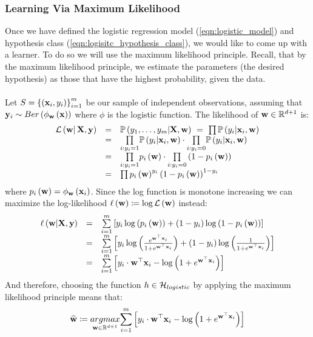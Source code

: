 \subsubsection{Learning Via Maximum Likelihood}
Once we have defined the logistic regression model (\ref{eqn:logistic_model}) and hypothesis class (\ref{eqn:logisitc_hypothesis_class}), we would like to come up with a learner. To do so we will use the maximum likelihood principle. Recall, that by the maximum likelihood principle, we estimate the parameters (the desired hypothesis) as those that have the highest probability, given the data.
\\~\\
Let $S=\left\{\left(\mathbf{x}_i,y_i\right)\right\}^m_{i=1}$ be our sample of independent observations, assuming that $\mathbf{y}_i\sim Ber\left(\phi_{\mathbf{w}}\left(\mathbf{x}\right)\right)$ where $\phi$ is the logistic function. The likelihood of $\mathbf{w}\in\mathbb{R}^{d+1}$ is: 
$$
\begin{array}{ccl}
	\mathcal{L}\left(\mathbf{w}\right|\mathbf{X},\mathbf{y}) & = & \mathbb{P}\left(y_1,\ldots,y_m|\mathbf{X},\mathbf{w}\right) \,\, = \,\, \prod \mathbb{P}\left(y_i|\mathbf{x}_i,\mathbf{w}\right)\\
	& = & \underset{i:y_i=1}{\prod}\mathbb{P}\left(y_i|\mathbf{x}_i,\mathbf{w}\right)\cdot \underset{i:y_i=0}{\prod}\mathbb{P}\left(y_i|\mathbf{x}_i,\mathbf{w}\right)\\
	& = & \underset{i:y_i=1}{\prod} p_i\left(\mathbf{w}\right) \cdot \underset{i:y_i=0}{\prod} \left( 1-p_i\left(\mathbf{w}\right)\right)\\
	& = & \prod p_i\left(\mathbf{w}\right)^{y_i} \left(1-p_i\left(\mathbf{w}\right)\right)^{1-y_i}
\end{array}
$$
where $p_i\left(\mathbf{w}\right)=\phi_{\mathbf{w}}\left(\mathbf{x}_i\right)$. Since the log function is monotone increasing we can maximize the log-likelihood $\ell\left(\mathbf{w}\right)\coloneqq \log\mathcal{L}\left(\mathbf{w}\right)$ instead: $$
\begin{array}{ccl}
	\ell\left(\mathbf{w}|\mathbf{X},\mathbf{y}\right) & = & \overset{m}{\underset{i=1}{\sum}}\left[y_i\log\left(p_i\left(\mathbf{w}\right)\right)+\left(1-y_i\right)\log\left(1-p_i\left(\mathbf{w}\right)\right)\right]\\
	& = & \overset{m}{\underset{i=1}{\sum}}\left[ y_i\log\left(\frac{e^{\mathbf{w}^\top \mathbf{x}_i}}{1+e^{\mathbf{w}^\top \mathbf{x}_i}}\right) + \left(1-y_i\right)\log\left(\frac{1}{1+e^{\mathbf{w}^\top\mathbf{x}_i}}\right) \right]\\
	& = & \overset{m}{\underset{i=1}{\sum}} \left[y_i\cdot \mathbf{w}^\top\mathbf{x}_i - \log\left(1+e^{\mathbf{w}^\top\mathbf{x}_i}\right)\right]
\end{array}
$$
And therefore, choosing the function $h\in\mathcal{H}_{logistic}$ by applying the maximum likelihood principle means that: 
\begin{equation}
	\widehat{\mathbf{w}}\coloneqq \underset{\mathbf{w}\in\mathbb{R}^{d+1}}{argmax} \overset{m}{\underset{i=1}{\sum}} \left[y_i\cdot \mathbf{w}^\top\mathbf{x}_i - \log\left(1+e^{\mathbf{w}^\top\mathbf{x}_i}\right)\right]
	\label{eqn:logistic_opt}
\end{equation}


